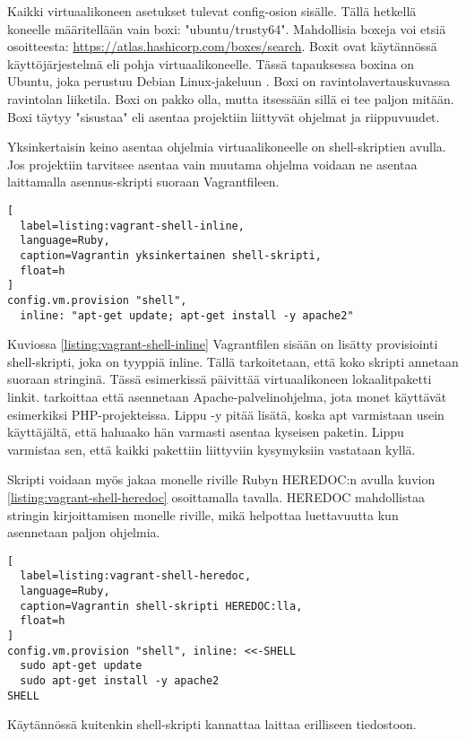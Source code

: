 Kaikki virtuaalikoneen asetukset tulevat config-osion sisälle. Tällä hetkellä koneelle määritellään vain boxi: "ubuntu/trusty64". Mahdollisia boxeja voi etsiä osoitteesta: \url{https://atlas.hashicorp.com/boxes/search}. Boxit ovat käytännössä käyttöjärjestelmä eli pohja virtuaalikoneelle. Tässä tapauksessa boxina on Ubuntu, joka perustuu Debian Linux-jakeluun \cite{link:ubuntu}. Boxi on ravintolavertauskuvassa ravintolan liiketila. Boxi on pakko olla, mutta itsessään sillä ei tee paljon mitään. Boxi täytyy "sisustaa" eli asentaa projektiin liittyvät ohjelmat ja riippuvuudet.

Yksinkertaisin keino asentaa ohjelmia virtuaalikoneelle on shell-skriptien avulla. Jos projektiin tarvitsee asentaa vain muutama ohjelma voidaan ne asentaa laittamalla asennus-skripti suoraan Vagrantfileen. 

\begin{lstlisting}[
  label=listing:vagrant-shell-inline,
  language=Ruby,
  caption=Vagrantin yksinkertainen shell-skripti,
  float=h
]
config.vm.provision "shell",
  inline: "apt-get update; apt-get install -y apache2"
\end{lstlisting}

Kuviossa \ref{listing:vagrant-shell-inline} Vagrantfilen sisään on lisätty provisiointi shell-skripti, joka on tyyppiä inline. Tällä tarkoitetaan, että koko skripti annetaan suoraan stringinä. Tässä esimerkissä  päivittää virtuaalikoneen lokaalitpaketti linkit.  tarkoittaa että asennetaan Apache-palvelinohjelma, jota monet käyttävät esimerkiksi PHP-projekteissa. Lippu -y pitää lisätä, koska apt varmistaan usein käyttäjältä, että haluaako hän varmasti asentaa kyseisen paketin. Lippu varmistaa sen, että kaikki pakettiin liittyviin kysymyksiin vastataan kyllä.

Skripti voidaan myös jakaa monelle riville Rubyn HEREDOC:n avulla kuvion \ref{listing:vagrant-shell-heredoc} osoittamalla tavalla. HEREDOC mahdollistaa stringin kirjoittamisen monelle riville, mikä helpottaa luettavuutta kun asennetaan paljon ohjelmia.

\begin{lstlisting}[
  label=listing:vagrant-shell-heredoc,
  language=Ruby,
  caption=Vagrantin shell-skripti HEREDOC:lla,
  float=h
]
config.vm.provision "shell", inline: <<-SHELL
  sudo apt-get update
  sudo apt-get install -y apache2
SHELL
\end{lstlisting}

Käytännössä kuitenkin shell-skripti kannattaa laittaa erilliseen tiedostoon.


